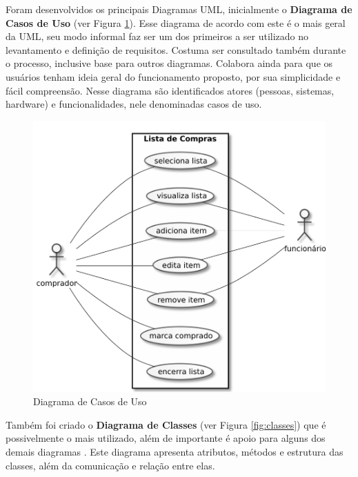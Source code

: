 \documentclass[12pt]{article}
\begin{document}
Foram desenvolvidos os principais Diagramas UML, inicialmente o \textbf{Diagrama de Casos de Uso} (ver Figura \ref{fig:usecase}). Esse diagrama de acordo com \cite{guedes2011} este é o mais geral da UML, seu modo informal faz ser um dos primeiros a ser utilizado no levantamento e definição de requisitos. Costuma ser consultado também durante o processo, inclusive base para outros diagramas. Colabora ainda para que os usuários tenham ideia geral do funcionamento proposto, por sua simplicidade e fácil compreensão. Nesse diagrama são identificados atores (pessoas, sistemas, hardware) e funcionalidades, nele denominadas casos de uso.

\begin{figure}[ht]
\centering
\includegraphics[width=.65\textwidth,keepaspectratio]{figures/usecase.pdf}
\caption{Diagrama de Casos de Uso}
\label{fig:usecase}
\end{figure}

Também foi criado o \textbf{Diagrama de Classes} (ver Figura \ref{fig:classes}) que é possivelmente o mais utilizado, além de importante é apoio para alguns dos demais diagramas \cite{guedes2011}. Este diagrama apresenta atributos, métodos e estrutura das classes, além da comunicação e relação entre elas.
\end{document}
